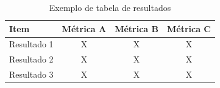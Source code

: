 \begin{table}[htb]
\centering
\caption{Exemplo de tabela de resultados}
\begin{tabular}{|l|c|c|c|}
\hline
\textbf{Item} & \textbf{Métrica A} & \textbf{Métrica B} & \textbf{Métrica C} \\ \hline
Resultado 1 & X & X & X \\ \hline
Resultado 2 & X & X & X \\ \hline
Resultado 3 & X & X & X \\ \hline
\end{tabular}
\end{table}
